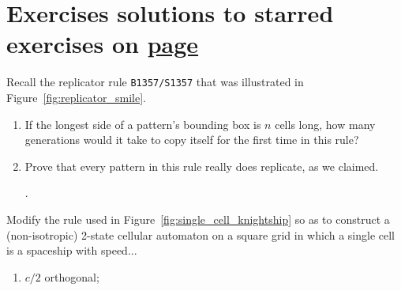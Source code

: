 \section*{Exercises \hfill \normalfont\textsf{\small solutions to starred exercises on \hyperlink{solutions_0e0p}{page \pageref{solutions_0e0p}}}}
\label{sec:solutions_0e0p}
\vspace*{-0.4cm}\hrulefill\vspace*{-0.3cm}\footnotesize\begin{multicols}{2}\vspace*{-0.4cm}\raggedcolumns{}
	\setlength{\parskip}{0pt}\ifdefined\FORPRINTING{}\else%
\fi
	
	
	\begin{problem}\label{exer:replicator_rule_really_replicates}
		Recall the replicator rule \texttt{B1357/S1357} that was illustrated in Figure~\ref{fig:replicator_smile}.\smallskip
		
		\begin{enumerate}[label=\bf\color{ocre}(\alph*)]
			\item {} If the longest side of a pattern's bounding box is $n$ cells long, how many generations would it take to copy itself for the first time in this rule?
			
			\item {} Prove that every pattern in this rule really does replicate, as we claimed.
			
			.
		\end{enumerate}
	\end{problem}


	\mfilbreak
	
	
	\begin{problem}\label{exer:0e0p_single_cell_spaceships}
		Modify the rule used in Figure~\ref{fig:single_cell_knightship} so as to construct a (non-isotropic) 2-state cellular automaton on a square grid in which a single cell is a spaceship with speed...\smallskip
		
		\begin{enumerate}[label=\bf\color{ocre}(\alph*)]
			\item {} $c/2$ orthogonal;
			

\end{enumerate}
\end{problem}
\end{multicols}
